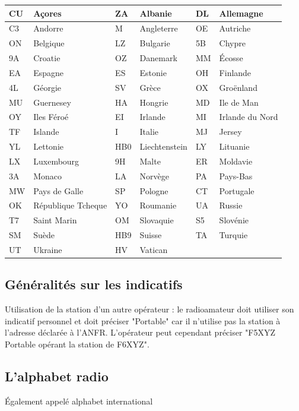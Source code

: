 \documentclass[a4paper,12pt,oneside]{report} %
\begin{document}
			\begin{center}
			\begin{longtable}{|L{1cm}|L{3.5cm}||L{1cm}|L{3.5cm}||L{1cm}|L{3.5cm}|}
			\hline
				CU & Açores & 			ZA & Albanie &				DL & Allemagne \tabularnewline
			\hline
				C3 & Andorre &			M & Angleterre & 			OE & Autriche \tabularnewline
			\hline
				ON & Belgique &			LZ & Bulgarie & 			5B & Chypre \tabularnewline
			\hline
				9A & Croatie & 			OZ & Danemark &				MM & Écosse \tabularnewline
			\hline
				EA & Espagne &			ES & Estonie & 				OH & Finlande \tabularnewline
			\hline
				4L & Géorgie & 			SV & Grèce & 				OX & Groënland \tabularnewline
			\hline
				MU & Guernesey &		HA & Hongrie & 				MD & Ile de Man \tabularnewline
			\hline
				OY & Iles Féroé & 		EI & Irlande & 				MI & Irlande du Nord \tabularnewline
			\hline
				TF & Islande &			I & Italie &				MJ & Jersey \tabularnewline
			\hline
				YL & Lettonie &			HB0 & Liechtenstein & 		LY & Lituanie \tabularnewline
			\hline
				LX & Luxembourg & 		9H & Malte &				ER & Moldavie \tabularnewline
			\hline
				3A & Monaco &			LA & Norvège & 				PA & Pays-Bas \tabularnewline
			\hline
				MW & Pays de Galle & 	SP & Pologne &				CT & Portugale \tabularnewline
			\hline
				OK & République Tcheque & YO & Roumanie & 			UA & Russie \tabularnewline
			\hline
				T7 & Saint Marin & 		OM & Slovaquie & 			S5 & Slovénie \tabularnewline
			\hline
				SM & Suède &			HB9 & Suisse &				TA & Turquie \tabularnewline
			\hline
				UT & Ukraine &			HV & Vatican & &\tabularnewline
			\hline
			\end{longtable}
			\end{center}
			
			\subsection{Généralités sur les indicatifs}
			Utilisation de la station d'un autre opérateur : le radioamateur doit utiliser son indicatif personnel et doit préciser "Portable" car il n'utilise pas la station à l'adresse déclarée à l'ANFR. L'opérateur peut cependant préciser "F5XYZ Portable opérant la station de F6XYZ".

		\subsection{L'alphabet radio}
			Également appelé alphabet international
			
\end{document}
